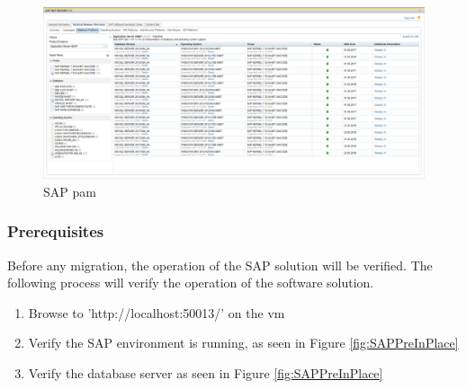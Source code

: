 \begin{figure}[h]
    \captionsetup{width=0.8\linewidth}
    \includegraphics[width=0.9\linewidth]{img/Methodologie/PAM.png}
    \centering
    \caption[SAP \acrshort{pam}]{SAP \acrfull{pam}}
    \label{fig:PAM}	
\end{figure}

\subsubsection{Prerequisites}
\label{sssec:SAP_Prerequisites}
Before any migration, the operation of the SAP solution will be verified.  
The following process will verify the operation of the software solution.

\begin{enumerate}
    \item Browse to 'http://localhost:50013/' on the \acrshort{vm}
    \item Verify the SAP environment is running, as seen in Figure \ref{fig:SAPPreInPlace}
    \item Verify the database server as seen in Figure \ref{fig:SAPPreInPlace}
\end{enumerate}

